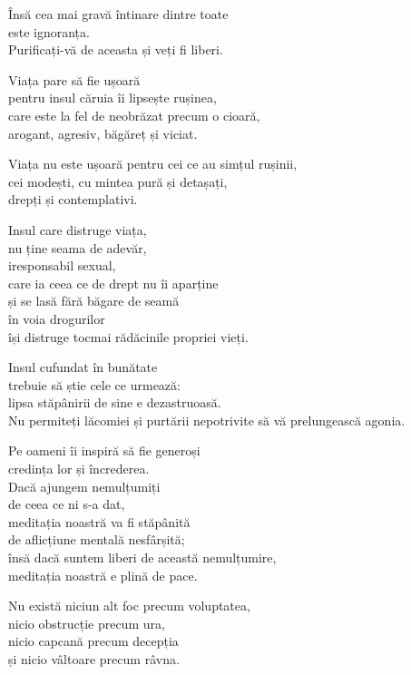 Însă cea mai gravă întinare dintre toate\\
este ignoranța.\\
Purificați-vă de aceasta și veți fi liberi.


Viața pare să fie ușoară\\
pentru insul căruia îi lipsește rușinea,\\
care este la fel de neobrăzat precum o cioară,\\
arogant, agresiv, băgăreț și viciat.


Viața nu este ușoară pentru cei ce au simțul rușinii,\\
cei modești, cu mintea pură și detașați,\\
drepți și contemplativi.


Insul care distruge viața,\\
nu ține seama de adevăr,\\
iresponsabil sexual,\\
care ia ceea ce de drept nu îi aparține\\
și se lasă fără băgare de seamă\\
în voia drogurilor\\
își distruge tocmai rădăcinile propriei vieți.


Insul cufundat în bunătate\\
trebuie să știe cele ce urmează:\\
lipsa stăpânirii de sine e dezastruoasă.\\
Nu permiteți lăcomiei și purtării nepotrivite să vă prelungească agonia.


Pe oameni îi inspiră să fie generoși\\
credința lor și încrederea.\\
Dacă ajungem nemulțumiți\\
de ceea ce ni s-a dat,\\
meditația noastră va fi stăpânită\\
 de aflicțiune mentală nesfârșită;\\
însă dacă suntem liberi de această nemulțumire,\\
meditația noastră e plină de pace.


Nu există niciun alt foc precum voluptatea,\\
nicio obstrucție precum ura,\\
nicio capcană precum decepția\\
și nicio vâltoare precum râvna.


